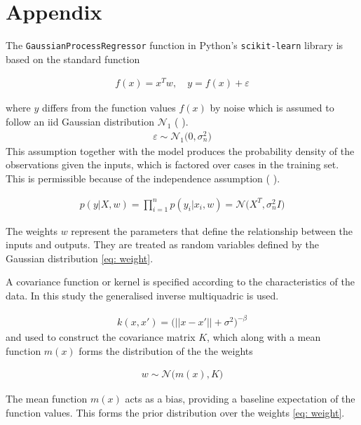 \documentclass[11pt,a4paper]{article}
\newcommand{\citeboth}[1]{\citeauthor{#1} \citep{#1}}
\begin{document}
\newpage

\section*{Appendix}
\label{sec: appendix}

The \texttt{GaussianProcessRegressor} function in Python's \texttt{scikit-learn} library is based on the 
standard function

\begin{align} 
    f(x) = x^{T}w, \quad{y = f(x) + \varepsilon}
\end{align}

where $y$ differs from the function values $f(x)$ by noise which is assumed
to follow an iid Gaussian distribution 
$\mathcal{N}_1$ (\citeboth{rasmussen2006}).
\begin{align*}
    \varepsilon \sim \mathcal{N}_1 \bigl(0, \sigma_{n}^2\bigr)
\end{align*}
This assumption together with the model produces the 
probability density of the observations given the inputs, 
which is factored over cases in the training set. This is
permissible because of the independence assumption (\citeboth{rasmussen2006}).

\begin{align}
    p(y|X,w) = \prod_{i=1}^{n} p(y_i|x_i ,w) = \mathcal{N}\bigl(X^T, \sigma_{n}^2 I\bigr)
\end{align}

The weights \( w \) represent the parameters that define the relationship between the inputs and outputs. 
They are treated as random variables defined by the Gaussian distribution \eqref{eq: weight}.


A covariance function or kernel
is specified according to the characteristics of the data. In this study the
generalised inverse multiquadric is used.

\begin{align}
    k(x,x') = \biggl( ||x-x'|| + \sigma^2\biggr)^{-\beta} \label{eq: gimq}
\end{align}
and used to construct the covariance matrix $K$, which along with 
a mean function $m(x)$ forms the distribution of the the weights 

\begin{align}
    w \sim \mathcal{N}\bigl(m(x), K\bigr) \label{eq: weight}
\end{align}


The mean function $m(x)$ acts as a bias, 
providing a baseline expectation of the function values. 
This forms the prior distribution over the weights \eqref{eq: weight}.
\end{document}

